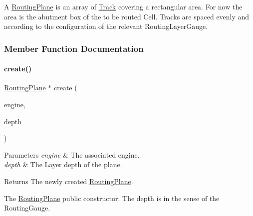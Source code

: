 A \hyperlink{classKite_1_1RoutingPlane}{Routing\+Plane} is an array of \hyperlink{classKite_1_1Track}{Track} covering a rectangular area. For now the area is the abutment box of the to be routed Cell. Tracks are spaced evenly and according to the configuration of the relevant Routing\+Layer\+Gauge.



\subsubsection{Member Function Documentation}
\mbox{\label{classKite_1_1RoutingPlane_a91d1fdb3aac133a9f687207499caf1c4}} 
\paragraph{\texorpdfstring{create()}{create()}}
{\footnotesize\ttfamily \hyperlink{classKite_1_1RoutingPlane}{Routing\+Plane} $\ast$ create (\begin{DoxyParamCaption}\item[{\hyperlink{classKite_1_1KiteEngine}{Kite\+Engine} $\ast$}]{engine,  }\item[{size\+\_\+t}]{depth }\end{DoxyParamCaption})\hspace{0.3cm}{\ttfamily [static]}}


\begin{DoxyParams}{Parameters}
{\em engine} & The associated engine. \\
\hline
{\em depth} & The Layer depth of the plane. \\
\hline
\end{DoxyParams}
\begin{DoxyReturn}{Returns}
The newly created \hyperlink{classKite_1_1RoutingPlane}{Routing\+Plane}.
\end{DoxyReturn}
The \hyperlink{classKite_1_1RoutingPlane}{Routing\+Plane} public constructor. The {\ttfamily depth} is in the sense of the Routing\+Gauge. \mbox{\label{classKite_1_1RoutingPlane_a21b9cefd33ae22e4c2070ad441bdd30b}} 
